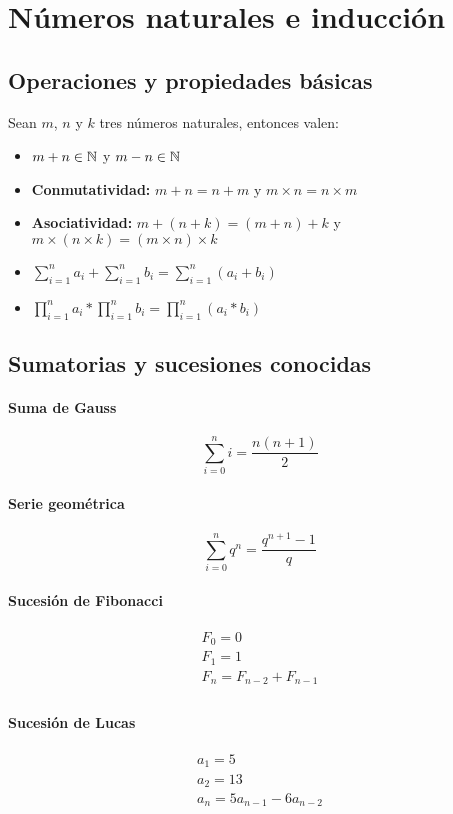 \section{Números naturales e inducción}
\subsection{Operaciones y propiedades básicas}

Sean $m$, $n$ y $k$ tres números naturales, entonces valen:
\begin{itemize}
    \item $m+n\in\mathbb{N}$ y $m-n\in\mathbb{N}$
    \item \textbf{Conmutatividad: } $m+n=n+m$ y $m\times n = n\times m$
    \item \textbf{Asociatividad:} $m+(n+k) = (m+n)+k$ y $m\times(n\times k) = (m\times n)\times k$
    \item $\sum_{i=1}^{n}a_i + \sum_{i=1}^{n}b_i = \sum_{i=1}^{n}(a_i+b_i)$
    \item $\prod_{i=1}^{n}a_i * \prod_{i=1}^{n}b_i = \prod_{i=1}^{n}(a_i*b_i)$
    \end{itemize}
    \subsection{Sumatorias y sucesiones conocidas}
    \paragraph{Suma de Gauss}
    $$\sum_{i=0}^{n} i = \frac{n(n+1)}{2}$$ 
    \paragraph{Serie geométrica}
    $$\sum_{i=0}^{n} q^n = \frac{q^{n+1} - 1}{q}$$
    \paragraph{Sucesión de Fibonacci}
    \begin{equation*}
    \begin{array}{c}
        F_0 = 0 \\
        F_1 = 1 \\
        F_n = F_{n-2} + F_{n-1} \\
    \end{array}
    \end{equation*}
    \paragraph{Sucesión de Lucas}
    \begin{equation*}
        \begin{array}{c}
        a_1 = 5 \\
        a_2 = 13 \\
        a_n = 5a_{n-1} - 6a_{n-2}
        \end{array}
    \end{equation*}

